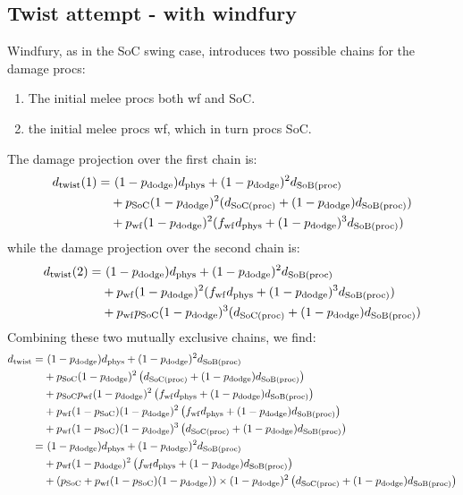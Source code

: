 \subsection{Twist attempt - with windfury}
Windfury, as in the SoC swing case, introduces two possible chains for the damage procs:
\begin{enumerate}
	\item The initial melee procs both wf and SoC.
	\item the initial melee procs wf, which in turn procs SoC.
\end{enumerate}
The damage projection over the first chain is:
\begin{equation*}
	\begin{aligned}
		\dtwist (1) =&~ (1 - \pdodge) \dphys + (1-\pdodge)^2 \dsobproc \\
		&+ \psoc (1-\pdodge)^2 (\dsocproc + (1-\pdodge) \dsobproc) \\
		&+ \pwf (1-\pdodge)^2 (\fwf \dphys + (1-\pdodge)^3 \dsobproc) 
	\end{aligned}
\end{equation*}
while the damage projection over the second chain is:
\begin{equation*}
	\begin{aligned}
		\dtwist (2) =&~ (1 - \pdodge) \dphys + (1-\pdodge)^2 \dsobproc \\
		&+ \pwf (1-\pdodge)^2 (\fwf \dphys + (1-\pdodge)^3 \dsobproc) \\
		&+  \pwf \psoc (1-\pdodge)^3 (\dsocproc + (1-\pdodge) \dsobproc) \\
	\end{aligned}
\end{equation*}
Combining these two mutually exclusive chains, we find:
\begin{equation*}
	\begin{aligned}
		\dtwist =&~ (1 - \pdodge) \dphys + (1-\pdodge)^2 \dsobproc \\
		&+ \psoc (1-\pdodge)^2 \left( \dsocproc + (1-\pdodge) \dsobproc \right) \\
		&+ \psoc\pwf (1-\pdodge)^2 \left(\fwf \dphys + (1-\pdodge) \dsobproc \right) \\
		&+ \pwf (1-\psoc) (1-\pdodge)^2 \left(\fwf \dphys + (1-\pdodge) \dsobproc \right) \\
		&+ \pwf(1-\psoc)(1-\pdodge)^3 \left( \dsocproc + (1-\pdodge) \dsobproc \right) \\
		=&~ (1 - \pdodge) \dphys + (1-\pdodge)^2 \dsobproc \\ 
		&+ \pwf (1-\pdodge)^2 \left( \fwf \dphys + (1 - \pdodge) \dsobproc \right) \\ 
		&+ \left( \psoc + \pwf(1-\psoc)(1-\pdodge) \right) \times (1-\pdodge)^2 \left( \dsocproc + (1-\pdodge)\dsobproc \right)
	\end{aligned}
\end{equation*}


